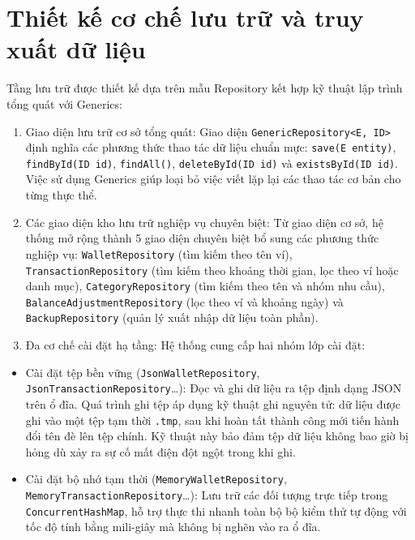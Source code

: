 \documentclass[a4paper,12pt]{report}
\providecommand{\tightlist}{%
  \setlength{\itemsep}{0pt}\setlength{\parskip}{0pt}}
\newcommand{\passthrough}[1]{#1}
\begin{document}
\section{Thiết kế cơ chế lưu trữ và truy xuất dữ
liệu}\label{thiux1ebft-kux1ebf-cux1a1-chux1ebf-lux1b0u-trux1eef-vuxe0-truy-xuux1ea5t-dux1eef-liux1ec7u}

Tầng lưu trữ được thiết kế dựa trên mẫu Repository kết hợp kỹ thuật lập
trình tổng quát với Generics:

\begin{enumerate}
\def\labelenumi{\arabic{enumi}.}
\item
  Giao diện lưu trữ cơ sở tổng quát: Giao diện
  \passthrough{\lstinline!GenericRepository<E, ID>!} định nghĩa các
  phương thức thao tác dữ liệu chuẩn mực:
  \passthrough{\lstinline!save(E entity)!},
  \passthrough{\lstinline!findById(ID id)!},
  \passthrough{\lstinline!findAll()!},
  \passthrough{\lstinline!deleteById(ID id)!} và
  \passthrough{\lstinline!existsById(ID id)!}. Việc sử dụng Generics
  giúp loại bỏ việc viết lặp lại các thao tác cơ bản cho từng thực thể.
\item
  Các giao diện kho lưu trữ nghiệp vụ chuyên biệt: Từ giao diện cơ sở,
  hệ thống mở rộng thành 5 giao diện chuyên biệt bổ sung các phương thức
  nghiệp vụ: \passthrough{\lstinline!WalletRepository!} (tìm kiếm theo
  tên ví), \passthrough{\lstinline!TransactionRepository!} (tìm kiếm
  theo khoảng thời gian, lọc theo ví hoặc danh mục),
  \passthrough{\lstinline!CategoryRepository!} (tìm kiếm theo tên và
  nhóm nhu cầu), \passthrough{\lstinline!BalanceAdjustmentRepository!}
  (lọc theo ví và khoảng ngày) và
  \passthrough{\lstinline!BackupRepository!} (quản lý xuất nhập dữ liệu
  toàn phần).
\item
  Đa cơ chế cài đặt hạ tầng: Hệ thống cung cấp hai nhóm lớp cài đặt:
\end{enumerate}

\begin{itemize}
\tightlist
\item
  Cài đặt tệp bền vững (\passthrough{\lstinline!JsonWalletRepository!},
  \passthrough{\lstinline!JsonTransactionRepository!}\ldots): Đọc và ghi
  dữ liệu ra tệp định dạng JSON trên ổ đĩa. Quá trình ghi tệp áp dụng kỹ
  thuật ghi nguyên tử: dữ liệu được ghi vào một tệp tạm thời
  \passthrough{\lstinline!.tmp!}, sau khi hoàn tất thành công mới tiến
  hành đổi tên đè lên tệp chính. Kỹ thuật này bảo đảm tệp dữ liệu không
  bao giờ bị hỏng dù xảy ra sự cố mất điện đột ngột trong khi ghi.
\item
  Cài đặt bộ nhớ tạm thời
  (\passthrough{\lstinline!MemoryWalletRepository!},
  \passthrough{\lstinline!MemoryTransactionRepository!}\ldots): Lưu trữ
  các đối tượng trực tiếp trong
  \passthrough{\lstinline!ConcurrentHashMap!}, hỗ trợ thực thi nhanh
  toàn bộ bộ kiểm thử tự động với tốc độ tính bằng mili-giây mà không bị
  nghẽn vào ra ổ đĩa.
\end{itemize}
\end{document}
